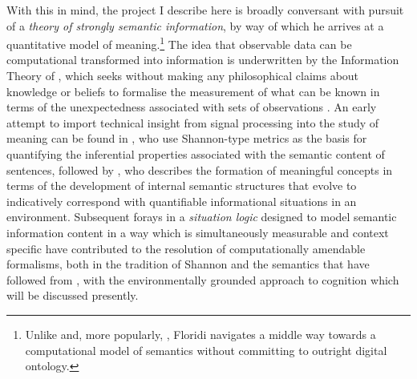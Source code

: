 With this in mind, the project I describe here is broadly conversant with  pursuit of a \emph{theory of strongly semantic information}, by way of which he arrives at a quantitative model of meaning.\footnote{Unlike \cite{Fredkin2003} and, more popularly, \cite{Bostrom2014}, Floridi navigates a middle way towards a computational model of semantics without committing to outright digital ontology.}  The idea that observable data can be computational transformed into information is underwritten by the Information Theory of \cite{ShannonEA1949}, which seeks without making any philosophical claims about knowledge or beliefs to formalise the measurement of what can be known in terms of the unexpectedness associated with sets of observations \citep[see][for a thorough treatment]{Pierce1980}.  An early attempt to import technical insight from signal processing into the study of meaning can be found in , who use Shannon-type metrics as the basis for quantifying the inferential properties associated with the semantic content of sentences, followed by \cite{Dretske1981}, who describes the formation of meaningful concepts in terms of the development of internal semantic structures that evolve to indicatively correspond with quantifiable informational situations in an environment.  Subsequent forays in a \emph{situation logic} designed to model semantic information content in a way which is simultaneously measurable and context specific \citep{BarwiseEA1983} have contributed to the resolution of computationally amendable formalisms, both in the tradition of Shannon and the semantics that have followed from \cite{Montague1974}, with the environmentally grounded approach to cognition which will be discussed presently.

